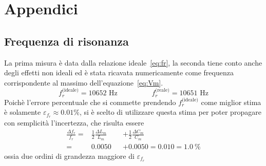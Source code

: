 \documentclass[12pt,italian]{article}
\begin{document}
\appendix
\section{Appendici}
\subsection{Frequenza di risonanza}\label{sec:resFreq}
La prima misura è data dalla relazione ideale~\eqref{eq:fr}, la seconda tiene
conto anche degli effetti non ideali ed è stata ricavata numericamente come
frequenza corrispondente al massimo dell'equazione~\eqref{eq:Vm}.
\begin{equation*}
	f_{r}^{\text{(ideale)}} = 10652 \text{ Hz} \hspace{2cm} f_{r}^{\text{(reale)}} = 10651 \text{ Hz}
\end{equation*}
Poichè l'errore percentuale che si commette prendendo $f_{r}^{\text{(ideale)}}$
come miglior stima è solamente $\varepsilon_{f_r} \approx 0.01\%$, si è scelto
di utilizzare questa stima per poter propagare con semplicità l'incertezza, che
risulta essere
\begin{equation*}
	\begin{alignedat}{2}
		\frac{\Delta f_{r}}{f_{r}} = & \frac{1}{2} \frac{\Delta L_{m}}{L_{m}} &  & + \frac{1}{2} \frac{\Delta C_{m}}{C_{m}} \\
		=                            & 0.0050                                 &  & + 0.0050
		= 0.010 = 1.0 \ \%
	\end{alignedat}
\end{equation*}
ossia due ordini di grandezza maggiore di $\varepsilon_{f_r}$
\end{document}
